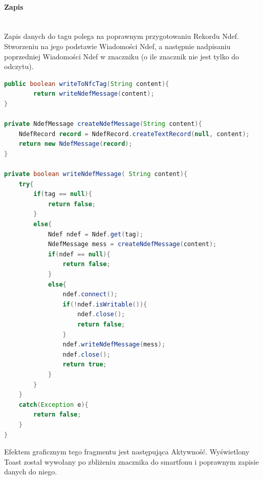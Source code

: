 \paragraph{Zapis}\mbox{}\\
Zapis danych do tagu polega na poprawnym przygotowaniu Rekordu Ndef. Stworzeniu na jego podstawie Wiadomości Ndef, a następnie nadpisaniu poprzedniej Wiadomości Ndef w znaczniku (o ile znacznik nie jest tylko do odczytu).
\begin{lstlisting}[language=Java]
public boolean writeToNfcTag(String content){
        return writeNdefMessage(content);
}

private NdefMessage createNdefMessage(String content){
    NdefRecord record = NdefRecord.createTextRecord(null, content);
    return new NdefMessage(record);
}

private boolean writeNdefMessage( String content){
    try{
        if(tag == null){
            return false;
        }
        else{
            Ndef ndef = Ndef.get(tag);
            NdefMessage mess = createNdefMessage(content);
            if(ndef == null){
                return false;
            }
            else{
                ndef.connect();
                if(!ndef.isWritable()){
                    ndef.close();
                    return false;
                }
                ndef.writeNdefMessage(mess);
                ndef.close();
                return true;
            }
        }
    }
    catch(Exception e){
        return false;
    }
}
\end{lstlisting}
Efektem graficznym tego fragmentu jest następująca Aktywność. Wyświetlony Toast został wywołany po zbliżeniu znacznika do smartfonu i poprawnym zapisie danych do niego.
